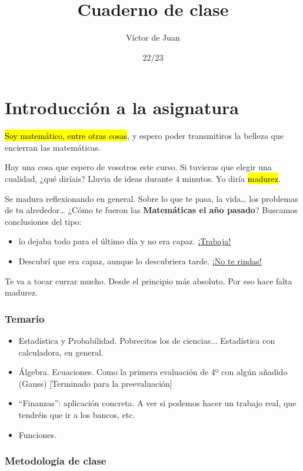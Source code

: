 \documentclass[palatino,nosec]{Docencia}
\title{Cuaderno de clase}
\author{Víctor de Juan}
\date{22/23}
\begin{document}
\pagestyle{plain}
\maketitle
\tableofcontents



\chapter{Introducción a la asignatura}


\hl{Soy matemático, entre otras cosas}, y espero poder transmitiros la belleza que encierran las matemáticas.

Hay una cosa que espero de vosotros este curso.
%
Si tuvieras que elegir una cualidad, ¿qué diríais? Lluvia de ideas durante 4 minutos. Yo diría \hl{madurez}.

Se madura reflexionando en general. Sobre lo que te pasa, la vida… los problemas de tu alrededor…  ¿Cómo te fueron las \textbf{Matemáticas el año pasado}? Buscamos conclusiones del tipo: 
\begin{itemize}
	\item lo dejaba todo para el último día y no era capaz. \ul{¡Trabaja!}
	\item Descubrí que era capaz, aunque lo descubriera tarde. \ul{¡No te rindas!}
\end{itemize}

Te va a tocar currar mucho. Desde el principio más absoluto. Por eso hace falta madurez. 

\subsection{Temario}

\begin{itemize}
	\item Estadística y Probabilidad. Pobrecitos los de ciencias... Estadística con calculadora, en general.
	\item Álgebra. Ecuaciones. Como la primera evaluación de 4º con algún añadido (Gauss) [Terminado para la preevaluación]
	\item “Finanzas”: aplicación concreta. A ver si podemos hacer un trabajo real, que tendréis que ir a los bancos, etc. 
	\item Funciones.
\end{itemize}


\subsection{Metodología de clase}
\end{document}
